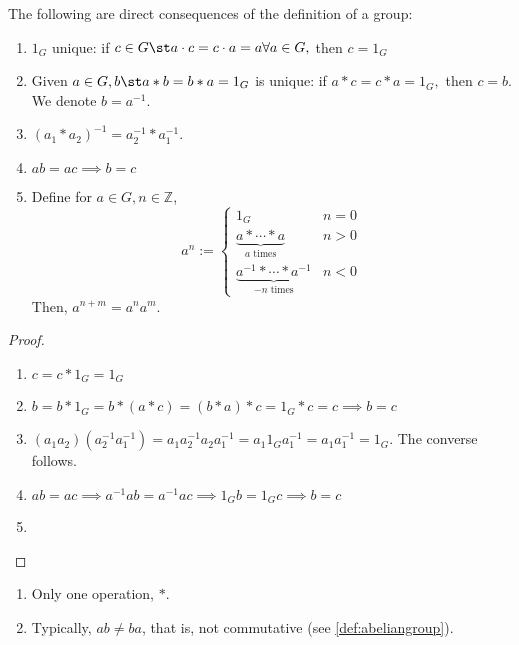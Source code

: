 \documentclass[12pt,oneside]{article}
\begin{document}
\begin{proposition}
  The following are direct consequences of the definition of a group:
  \begin{enumerate}
    \item $1_G$ unique: if $c \in G \st a \cdot c = c \cdot a = a \forall a \in G,$ then $c = 1_G$
    \item Given $a \in G, b \st a \ast b = b \ast a = 1_G$ is unique: if $a \ast c = c \ast a = 1_G,$ then $c = b$. We denote $b = a^{-1}$.
    \item $(a_1 \ast a_2)^{-1} = a_2^{-1} \ast a_1^{-1}$.
    \item $ab = ac \implies b = c$
    \item Define for $a \in G, n \in \mathbb{Z}$, \[
      a^{n} := \begin{cases}
        1_G & n = 0\\
        \underbrace{a \ast \cdots \ast a}_{a \text{ times}} & n > 0\\
        \underbrace{a^{-1} \ast \cdots \ast a^{-1}}_{-n \text{ times}} & n < 0
      \end{cases}
      \]
      Then, $a^{n+m} = a^n a^m$.
  \end{enumerate}
\end{proposition}
\begin{proof}
  \begin{enumerate}
    \item $c = c \ast 1_G = 1_G$
    \item $b = b \ast 1_G = b \ast (a \ast c) = (b \ast a) \ast c = 1_G \ast c = c \implies b = c$
    \item $(a_1a_2)(a_2^{-1}a_1^{-1}) = a_1 a_2^{-1}a_2a_1^{-1} = a_1 1_G a_1^{-1} = a_1 a_1^{-1} = 1_G$. The converse follows.
    \item $ab = ac \implies a^{-1} ab = a^{-1}ac \implies 1_G b = 1_G c \implies b = c$
    \item %
  \end{enumerate}
\end{proof}

\begin{proposition}
  \begin{enumerate}
    \item Only one operation, $\ast$.
    \item Typically, $ab \neq ba$, that is, not commutative (see \cref{def:abeliangroup}).
  \end{enumerate}
\end{proposition}
\end{document}

